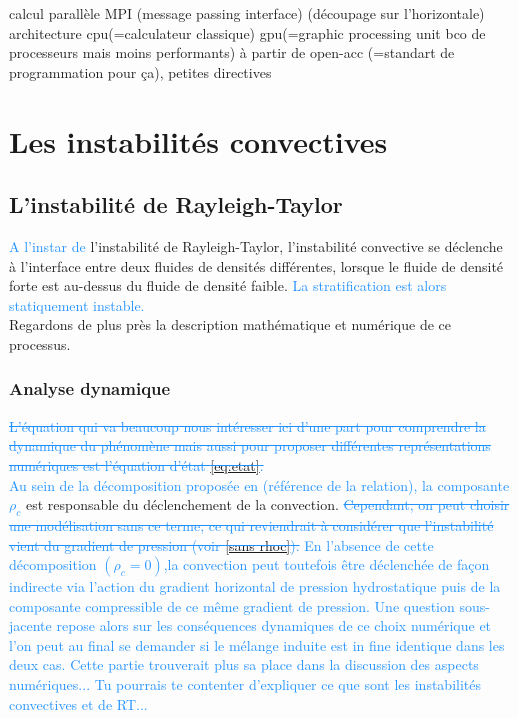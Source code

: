 \documentclass{rapportECC}
\newcommand{\FAadd}[1]{\textcolor{DodgerBlue}{{#1}}}                     %
\newcommand{\FAdel}[1]{\textcolor{DodgerBlue}{\sout{#1}}}                %
\begin{document}
calcul parallèle MPI (message passing interface) (découpage sur l'horizontale) \\
architecture cpu(=calculateur classique) gpu(=graphic processing unit bco de processeurs mais moins performants)  à partir de open-acc (=standart de programmation pour ça), petites directives\\


\section{Les instabilités convectives}
\subsection{L'instabilité de Rayleigh-Taylor}

\FAadd{A l'instar de} l'instabilité de Rayleigh-Taylor, l'instabilité convective se déclenche à l'interface entre deux fluides de densités différentes, lorsque le fluide de densité forte est au-dessus du fluide de densité faible. \FAadd{La stratification est alors \FAadd{statiquement instable}.} \\ 
Regardons de plus près la description mathématique et numérique de ce processus.

\subsubsection{Analyse dynamique}

\FAdel{L'équation qui va beaucoup nous intéresser ici d'une part pour comprendre la dynamique du phénomène mais aussi pour proposer différentes représentations numériques est l'équation d'état \eqref{eq:etat}. }\\
\vspace{0.5 cm}
\FAadd{Au sein de la décomposition proposée en (référence de la relation), la composante $\rho_c$} est responsable du déclenchement de la convection. \FAdel{Cependant, on peut choisir une modélisation sans ce terme, ce qui reviendrait à considérer que l'instabilité vient du gradient de pression (voir \ref{sans rhoc}).} \FAadd{En l'absence de cette décomposition $(\rho_c=0)$,la convection peut toutefois être déclenchée de façon indirecte via l'action du gradient horizontal de pression hydrostatique puis de la composante compressible de ce même gradient de pression. Une question sous-jacente repose alors sur les conséquences dynamiques de ce choix numérique et l'on peut au final se demander si le mélange induite est in fine identique dans les deux cas.} \FAadd{Cette partie trouverait plus sa place dans la discussion des aspects numériques... Tu pourrais te contenter d'expliquer ce que sont les instabilités convectives et de RT...}
\end{document}
